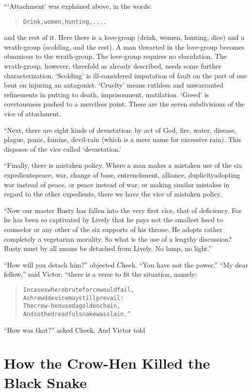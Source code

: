\documentclass[article, twoside, 14pt]{memoir}
\renewenvironment{verbatim}{%
\begin{quote}%
\vskip -10pt%
\begin{alltt}\normalfont\large}{\end{alltt}%
\end{quote}%
\vskip -10pt
} %
\begin{document}
“`Attachment' was explained above, in the words:

\begin{verbatim}
Drink, women, hunting, ....
\end{verbatim}
and the rest of it. Here there is a love-group (drink, women,
hunting, dice) and a wrath-group (scolding, and the rest). A man
thwarted in the love-group becomes obnoxious to the wrath-group.
The love-group requires no elucidation. The wrath-group, however,
threefold as already described, needs some further
characterization. `Scolding' is ill-considered imputation of fault
on the part of one bent on injuring an antagonist. `Cruelty' means
ruthless and unwarranted refinements in putting to death,
imprisonment, mutilation. `Greed' is covetousness pushed to a
merciless point. These are the seven subdivisions of the vice of
attachment.

“Next, there are eight kinds of devastation: by act of God, fire,
water, disease, plague, panic, famine, devil-rain (which is a mere
name for excessive rain). This disposes of the vice called
`devastation.'

“Finally, there is mistaken policy. Where a man makes a mistaken
use of the six expedients{\textemdash}peace, war, change of base,
entrenchment, alliance, duplicity{\textemdash}adopting war instead of peace,
or peace instead of war, or making similar mistakes in regard to
the other expedients, there we have the vice of mistaken policy.

``Now our master Rusty has fallen into the very first vice, that of deficiency. For he has been so captivated by Lively that he pays not the smallest heed to counselor or any other of the six supports of his throne. He adopts rather completely a vegetarian morality. So what is the use of a lengthy discussion? Rusty must by all means be detached from Lively. No lamp, no light.''

``How will you detach him?'' objected Cheek.
``You have not the power.'' ``My dear fellow,'' said Victor, “there
is a verse to fit the situation, namely:

\begin{verbatim}
In cases where brute force would fail,
    A shrewd device may still prevail:
The crow-hen used a golden chain,
    And so the dreadful snake was slain.”
\end{verbatim}
``How was that?'' asked Cheek. And Victor told

\chapter{How the Crow-Hen Killed the Black Snake}
\end{document}
